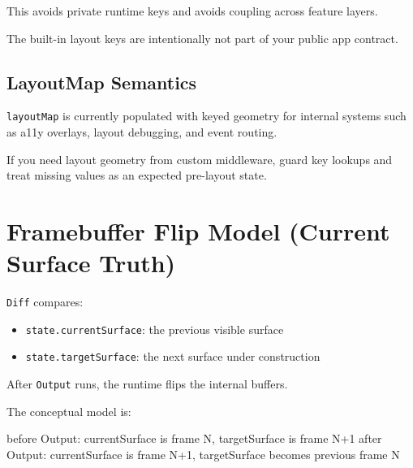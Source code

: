 This avoids private runtime keys and avoids coupling across feature layers.

The built-in layout keys are intentionally not part of your public app contract.

\subsection{LayoutMap Semantics}\label{record-014-layoutmap-semantics}

\texttt{l\allowbreak{}a\allowbreak{}y\allowbreak{}o\allowbreak{}u\allowbreak{}t\allowbreak{}M\allowbreak{}a\allowbreak{}p} is currently populated with keyed geometry for internal systems such as a11y overlays, layout debugging, and event routing.

If you need layout geometry from custom middleware, guard key lookups and treat missing values as an expected pre-layout state.

\section{Framebuffer Flip Model (Current Surface Truth)}\label{record-014-framebuffer-flip-model-current-surface-truth}

\texttt{D\allowbreak{}i\allowbreak{}f\allowbreak{}f} compares:

\begin{itemize}
\tightlist
\item
  \texttt{s\allowbreak{}t\allowbreak{}a\allowbreak{}t\allowbreak{}e\allowbreak{}.\allowbreak{}c\allowbreak{}u\allowbreak{}r\allowbreak{}r\allowbreak{}e\allowbreak{}n\allowbreak{}t\allowbreak{}S\allowbreak{}u\allowbreak{}r\allowbreak{}f\allowbreak{}a\allowbreak{}c\allowbreak{}e}: the previous visible surface
\item
  \texttt{s\allowbreak{}t\allowbreak{}a\allowbreak{}t\allowbreak{}e\allowbreak{}.\allowbreak{}t\allowbreak{}a\allowbreak{}r\allowbreak{}g\allowbreak{}e\allowbreak{}t\allowbreak{}S\allowbreak{}u\allowbreak{}r\allowbreak{}f\allowbreak{}a\allowbreak{}c\allowbreak{}e}: the next surface under construction
\end{itemize}

After \texttt{O\allowbreak{}u\allowbreak{}t\allowbreak{}p\allowbreak{}u\allowbreak{}t} runs, the runtime flips the internal buffers.

The conceptual model is:

\begin{CodeBlock}
before Output:   currentSurface is frame N, targetSurface is frame N+1
after Output:    currentSurface is frame N+1, targetSurface becomes previous frame N
\end{CodeBlock}

